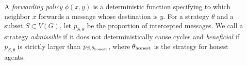 \documentclass[prodmode,acmec]{ec-acmsmall}
\begin{document}
A \emph{forwarding policy} $\phi(x,y)$ is a deterministic function specifying
to which neighbor $x$ forwards a message whose destination is $y$. For a
strategy $\theta$ and a subset $S \subset V(G)$, let $p_{S,\theta}$ be the
proportion of intercepted messages. We call a strategy \emph{admissible} if it
does not deterministically cause cycles and \emph{beneficial} if $p_{S,
\theta}$ is strictly larger than $p_{S, \theta_{\textup{honest}}}$, where
$\theta_{\textup{honest}}$ is the strategy for honest agents. 

%
%
%
\end{document}
